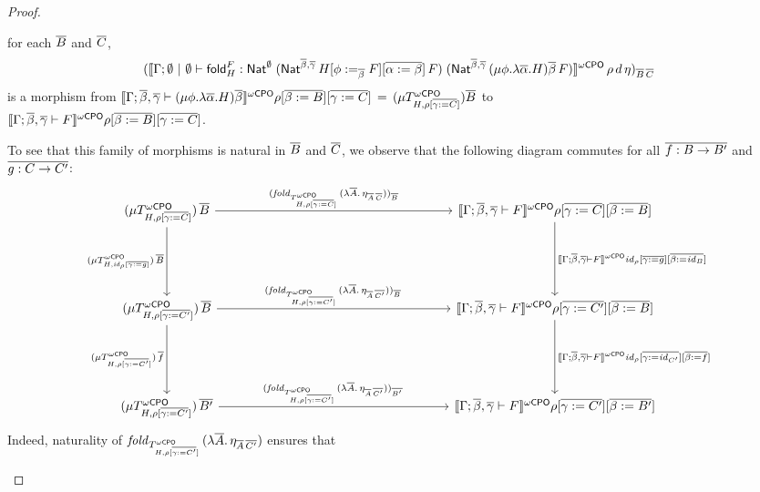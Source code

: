 \documentclass[acmsmall,review,anonymous]{acmart}
\theoremstyle{definition}
\renewcommand{\id}{\mathit{id}}
\begin{document}
\begin{proof}
\begin{itemize}
for each $\overline{B}$ and $\overline{C}$,
\[(\llbracket{\Gamma; \emptyset~|~\emptyset \vdash \mathsf{fold}^F_H :
  \mathsf{Nat}^\emptyset\;(\mathsf{Nat}^{\overline{\beta}, \overline{\gamma}}\,H[\phi
    :=_{\overline{\beta}} F][\overline{\alpha := \beta}]\,F)\;
  (\mathsf{Nat}^{{\overline{\beta},\overline{\gamma}} }\,(\mu \phi.\lambda \overline
  \alpha.H)\overline \beta\,F)}\rrbracket^{{\omega\mathsf{CPO}}}\,\rho\,d\,\eta)_{\overline{B}\,\overline{C}}\] is a
morphism from
$\llbracket{\Gamma; \overline{\beta},\overline{\gamma} \vdash (\mu
  \phi.\lambda \overline \alpha.H)\overline \beta}\rrbracket^{{\omega\mathsf{CPO}}}\rho[\overline{\beta :=
    B}][\overline{\gamma := C}]\,=\, (\mu T^{\omega\mathsf{CPO}}_{H,\rho[\overline{\gamma := C}]})
\overline{B}$ to\\ $\llbracket{\Gamma;\overline{\beta},\overline{\gamma} \vdash
  F}\rrbracket^{{\omega\mathsf{CPO}}}\rho[\overline{\beta := B}][\overline{\gamma := C}]$.

To see that this family of morphisms is natural in $\overline{B}$ and
$\overline{C}$, we observe that the following diagram commutes for all
$\overline{f : B \to B'}$ and $\overline{g : C \to C'}$:
{\tiny
\[\begin{tikzcd}[column sep=2.5in, row sep=0.75in]
(\mu T^\oCPO_{H,\rho[\ol{\gamma := C}]})\, \ol{B}
\ar[d, "{(\mu T^\oCPO_{H,\id_\rho[\ol{\gamma := g}]}) \, \ol{B}}"'] \ar[r, 
  "{(\mathit{fold}_{T^\oCPO_{H,\rho[\ol{\gamma := C}]}}\,(\lambda
    \ol{A}.\,\eta_{\ol{A}\,\ol{C}}))_{\ol{B}}}"] 
& \oCPOsem{\Gamma; \ol{\beta},\ol{\gamma} \vdash F}\rho[\ol{\gamma :=
    C}][\ol{\beta := B}]\ar[d, "{\oCPOsem{\Gamma;
      \ol{\beta},\ol{\gamma} \vdash F}\id_\rho[\ol{\gamma := 
    g}][\ol{\beta := \id_B}]}"]\\
(\mu T^\oCPO_{H,\rho[\ol{\gamma := C'}]})\, \ol{B} 
\ar[r,"{(\mathit{fold}_{T^\oCPO_{H,\rho[\ol{\gamma :=
            C'}]}}\,(\lambda \ol{A}.\,\eta_{\ol{A}\,\ol{C'}}))_{\ol{B}}\,}" ] 
\ar[d, "{(\mu T^\oCPO_{H,\rho[\ol{\gamma := C'}]}) \, \ol{f}}"'] & 
 \oCPOsem{\Gamma; \ol{\beta},\ol{\gamma} \vdash F}\rho[\ol{\gamma :=
    C'}][\ol{\beta := B}]\ar[d, "{\oCPOsem{\Gamma;
      \ol{\beta},\ol{\gamma} \vdash F}\id_\rho[\ol{\gamma := 
    \id_{C'}}][\ol{\beta := f}]}"]\\
 (\mu T^\oCPO_{H,\rho[\ol{\gamma := C'}]})\, \ol{B'} 
\ar[r,"{(\mathit{fold}_{T^\oCPO_{H,\rho[\ol{\gamma :=
            C'}]}}\,(\lambda \ol{A}.\,\eta_{\ol{A}\,\ol{C'}}))_{\ol{B'}}\,}"
] &  
 \oCPOsem{\Gamma; \ol{\beta},\ol{\gamma} \vdash F}\rho[\ol{\gamma :=
    C'}][\ol{\beta := B'}]
\end{tikzcd}\]}
Indeed, naturality of $\mathit{fold}_{T^{\omega\mathsf{CPO}}_{H,\rho[\overline{\gamma :=
        C'}]}}\,(\lambda \overline{A}.\,\eta_{\overline{A}\,\overline{C'}})$ ensures that

\end{itemize}
\end{proof}
\end{document}
